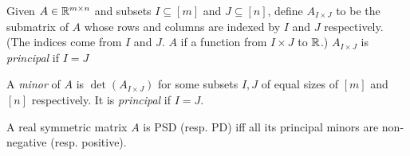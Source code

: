 \begin{definition}
    Given $A \in \mathbb{R}^{m \times n}$ and subsets $I \subseteq [m]$ and
    $J \subseteq [n]$, define $A_{I \times J}$ to be the submatrix of $A$
    whose rows and columns are indexed by $I$ and $J$ respectively.
    (The indices come from $I$ and $J$.
    $A$ if a function from $I \times J$ to $\mathbb{R}$.)
    $A_{I \times J}$ is \emph{principal} if $I = J$

    A \emph{minor} of $A$ is $\det(A_{I \times J})$ for some subsets
    $I, J$ of equal sizes of $[m]$ and $[n]$ respectively.
    It is \emph{principal} if $I = J$.
\end{definition}

\begin{theorem*} \label{thm:sylv}
    A real symmetric matrix $A$ is PSD (resp.{} PD)
    iff all its principal minors are non-negative (resp.{} positive).
\end{theorem*}

